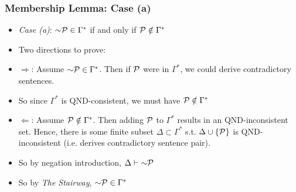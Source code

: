 \begin{frame}
\frametitle{Membership Lemma: Case (a)}

\begin{itemize}

\item \emph{Case (a)}: $\enot \metav{P} \in \Gamma^{\ast}$ if and only if $\mathcal{P} \notin \Gamma^{\ast}$

\item Two directions to prove:

\item[] $\Rightarrow$: Assume $\enot \metav{P} \in \Gamma^{\ast}$. Then if  $\mathcal{P}$ were in $\Gamma^{\ast}$, we could derive contradictory sentences. 

\item[] So since $\Gamma^{\ast}$ is QND-consistent, we must have $\mathcal{P} \notin \Gamma^{\ast}$

\item[] $\Leftarrow$: Assume $\mathcal{P} \notin \Gamma^{\ast}$. Then adding $\mathcal{P}$ to $\Gamma^{\ast}$ results in an QND-inconsistent set. Hence, there is some finite subset $\Delta \subset \Gamma^{\ast}$ s.t. $\Delta \cup \{ \mathcal{P}\}$ is QND-inconsistent (i.e. derives contradictory sentence pair). 

\item So by negation introduction, $\Delta \vdash \enot \metav{P}$

\item So by \emph{The Stairway}, $\enot \metav{P} \in \Gamma^{\ast}$


\end{itemize}
\end{frame}

